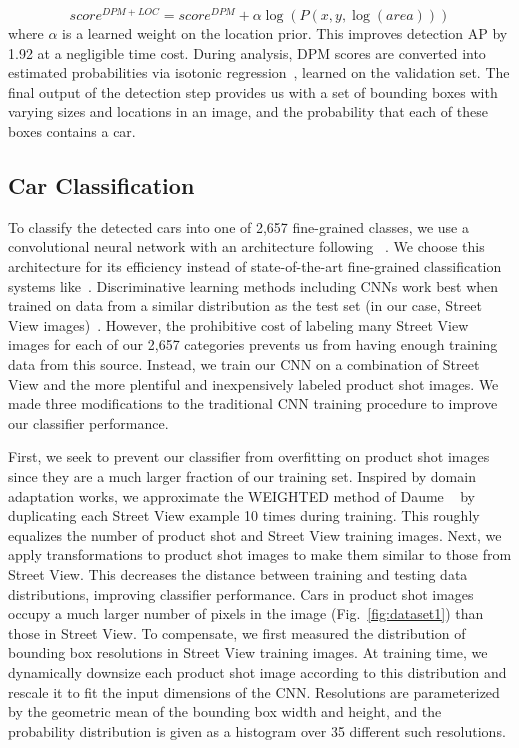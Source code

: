 \documentclass[letterpaper]{article}
\begin{document}
\begin{equation}
score^{DPM+LOC} = score^{DPM} + \alpha \log{(P(x,y,\log{(area)}))}
\end{equation}
where $\alpha$ is a learned weight on the location prior. This improves detection AP by 1.92 at a negligible time cost. During analysis, DPM scores are converted into estimated probabilities via isotonic regression~\cite{isotonic}, learned on the validation set.
The final output of the detection step provides us with a set of bounding boxes with varying sizes and locations in an image, and the probability that each of these boxes contains a car.

\subsection{Car Classification}
To classify the detected cars into one of 2,657 fine-grained classes, we use a convolutional neural network with an architecture following ~\cite{alexnet}. We choose this architecture for its efficiency instead of state-of-the-art fine-grained classification systems like~\cite{jon1,jon2}. Discriminative learning methods including CNNs work best when trained on data from a similar distribution as the test set (in our case, Street View images)~\cite{domain}. However, the prohibitive cost of labeling many Street View images for each of our 2,657 categories prevents us from having enough training data from this source. Instead, we train our CNN on a combination of Street View and the more plentiful and inexpensively labeled product shot images. We made three modifications to the traditional CNN training procedure to improve our classifier performance.

First, we seek to prevent our classifier from overfitting on product shot images since they are a much larger fraction of our training set. Inspired by domain adaptation works, we approximate the WEIGHTED method of Daume  ~\cite{frustrating} by duplicating each Street View example 10 times during training. This roughly equalizes the number of product shot and Street View training images. Next, we apply transformations to product shot images to make them similar to those from Street View. This decreases the distance between training and testing data distributions, improving classifier performance. Cars in product shot images occupy a much larger number of pixels in the image (Fig.~\ref{fig:dataset1}) than those in Street View. To compensate, we first measured the distribution of bounding box resolutions in Street View training images. At training time, we dynamically downsize each product shot image according to this distribution and  rescale it to fit the input dimensions of the CNN. Resolutions are parameterized by the geometric mean of the bounding box width and height, and the probability distribution is given as a histogram over 35 different such resolutions. 
\end{document}
